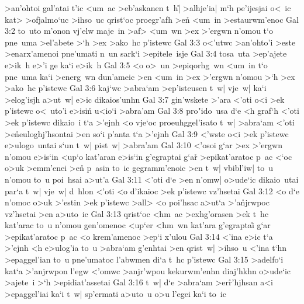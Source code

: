 >an'ohtoi
gal'atai
t'ic
<um~ac
>eb'askanen
t~h|\r{}
>alhje'ia|
m`h
pe'ijesjai
o<~ic
kat>
>ofjalmo`uc
>ihso~uc
qrist`oc
proegr'afh
>en\r{}
<um~in
>estaurwm'enoc\bibvsend
\vs Gal 3:2
to~uto
m'onon
vj'elw
maje~in
>af>
<um~wn
>ex
>'ergwn
n'omou
t`o
pne~uma
>el'abete
>`h
>ex
>ako~hc
p'istewc\bibvsend
\vs Gal 3:3
o<'utwc
>an'ohto'i
>este
>enarx'amenoi
pne'umati
n~un
sark`i
>epitele~isje\bibvsend
\vs Gal 3:4
tosa~uta
>ep'ajete
e>ik~h
e>'i
ge
ka`i
e>ik~h\bibvsend
\vs Gal 3:5
<o
o>~un
>epiqorhg~wn
<um~in
t`o
pne~uma
ka`i
>energ~wn
dun'ameic
>en
<um~in
>ex
>'ergwn
n'omou
>`h
>ex
>ako~hc
p'istewc\bibvsend
\vs Gal 3:6
kaj`wc
>abra`am
>ep'isteusen
t~w|
vje~w|
ka`i
>elog'isjh
a>ut~w|
e>ic
dikaios'unhn\bibvsend
\vs Gal 3:7
gin'wskete
>'ara
<'oti
o<i
>ek
p'istewc
o<~uto'i
e>isin\r{}
u<io`i
>abra'am\bibvsend
\vs Gal 3:8
pro"ido~usa
d`e
<h
graf`h
<'oti
>ek
p'istewc
dikaio~i
t`a
>'ejnh
<o
vje`oc
proeuhggel'isato
t~w|
>abra`am
<'oti
>e\r{n}euloghj'hsontai
>en
so`i
p'anta
t`a
>'ejnh\bibvsend
\vs Gal 3:9
<'wste
o<i
>ek
p'istewc
e>ulogo~untai
s`un
t~w|
pist~w|
>abra'am\bibvsend
\vs Gal 3:10
<'osoi
g`ar
>ex
>'ergwn
n'omou
e>is`in
<up`o
kat'aran
e>is`in
g'egraptai
g`a\r{r}
>epikat'aratoc
p~ac
<`oc
o>uk
>emm'enei
>e\r{n}
p~asin
to~ic
gegramm'enoic
>en
t~w|
vbibl'iw|
to~u
n'omou
to~u
poi~hsai
a>ut'a\bibvsend
\vs Gal 3:11
<'oti
d`e
>en
n'omw|
o>ude`ic
dikaio~utai
par`a
t~w|
vje~w|
d~hlon
<'oti
<o
d'ikaioc
>ek
p'istewc
vz'hsetai\bibvsend
\vs Gal 3:12
<o
d`e
n'omoc
o>uk
>'estin
>ek
p'istewc
>all>
<o
poi'hsac
a>ut`a
>'a\r{n}jrwpoc
vz'hsetai
>en
a>uto~ic\bibvsend
\vs Gal 3:13
qrist`oc
<hm~ac
>exhg'orasen
>ek
t~hc
kat'arac
to~u
n'omou
gen'omenoc
<up`er
<hm~wn
kat'ara
g'egraptai\r{}
g`ar
>epikat'aratoc
p~ac
<o
krem'amenoc
>ep`i
x'ulou\bibvsend
\vs Gal 3:14
<'ina
e>ic
t`a
>'ejnh
<h
e>ulog'ia
to~u
>abra`am
g'enhtai
>en
qrist~w|
>ihso~u
<'ina
t`hn
>epaggel'ian
to~u
pne'umatoc
l'abwmen
di`a
t~hc
p'istewc\bibvsend
\vs Gal 3:15
>adelfo`i
kat`a
>'anjrwpon
l'egw
<'omwc
>anjr'wpou
kekurwm'enhn
diaj'hkhn
o>ude`ic
>ajete~i
>`h
>epidiat'assetai\bibvsend
\vs Gal 3:16
t~w|
d`e
>abra`am
>er\r{r}'hjhsan
a<i
>epaggel'iai
ka`i
t~w|
sp'ermati
a>uto~u
o>u
l'egei
ka`i
to~ic
